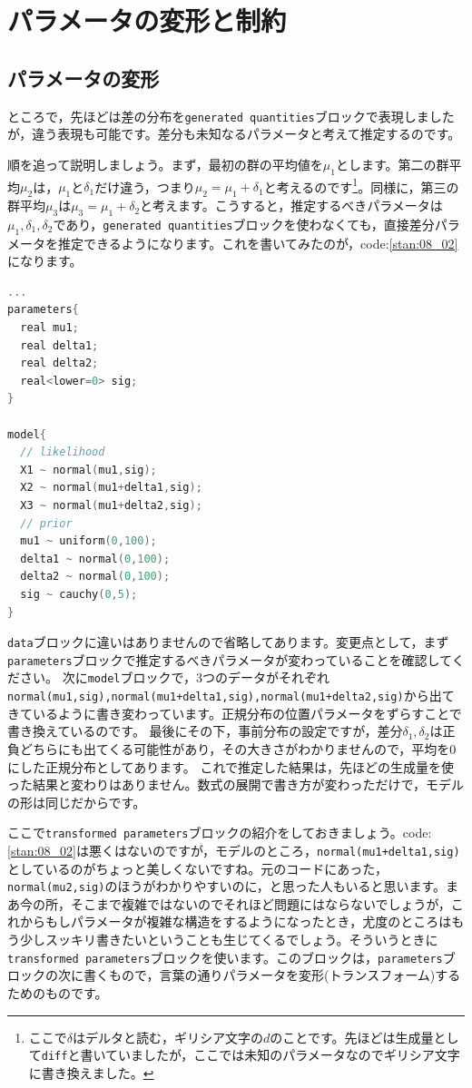 \documentclass{ltjsbook}
\begin{document}
\section{パラメータの変形と制約}
\subsection{パラメータの変形}
ところで，先ほどは差の分布を\verb|generated quantities|ブロックで表現しましたが，違う表現も可能です。差分も未知なるパラメータと考えて推定するのです。

順を追って説明しましょう。まず，最初の群の平均値を$\mu_1$とします。第二の群平均$\mu_2$は，$\mu_1$と$\delta_1$だけ違う，つまり$\mu_2=\mu_1+\delta_1$と考えるのです\footnote{ここで$\delta$はデルタと読む，ギリシア文字の$d$のことです。先ほどは生成量として\verb|diff|と書いていましたが，ここでは未知のパラメータなのでギリシア文字に書き換えました。}。同様に，第三の群平均$\mu_3$は$\mu_3 = \mu_1+\delta_2$と考えます。こうすると，推定するべきパラメータは$\mu_1,\delta_1,\delta_2$であり，\verb|generated quantities|ブロックを使わなくても，直接差分パラメータを推定できるようになります。これを書いてみたのが，code:\ref{stan:08_02}になります。

\begin{lstlisting}[language=C++,label={stan:08_02},caption={差分を直接推定するコード}]
...
parameters{
  real mu1;
  real delta1;
  real delta2;
  real<lower=0> sig;
}

model{
  // likelihood
  X1 ~ normal(mu1,sig);
  X2 ~ normal(mu1+delta1,sig);
  X3 ~ normal(mu1+delta2,sig);
  // prior
  mu1 ~ uniform(0,100);
  delta1 ~ normal(0,100);
  delta2 ~ normal(0,100);
  sig ~ cauchy(0,5);
}

\end{lstlisting}

\verb|data|ブロックに違いはありませんので省略してあります。変更点として，まず\verb|parameters|ブロックで推定するべきパラメータが変わっていることを確認してください。
次に\verb|model|ブロックで，3つのデータがそれぞれ\verb|normal(mu1,sig),normal(mu1+delta1,sig),normal(mu1+delta2,sig)|から出てきているように書き変わっています。正規分布の位置パラメータをずらすことで書き換えているのです。
最後にその下，事前分布の設定ですが，差分$\delta_1,\delta_2$は正負どちらにも出てくる可能性があり，その大きさがわかりませんので，平均を0にした正規分布としてあります。
これで推定した結果は，先ほどの生成量を使った結果と変わりはありません。数式の展開で書き方が変わっただけで，モデルの形は同じだからです。

ここで\verb|transformed parameters|ブロックの紹介をしておきましょう。code:\ref{stan:08_02}は悪くはないのですが，モデルのところ，\verb|normal(mu1+delta1,sig)|としているのがちょっと美しくないですね。元のコードにあった，\verb|normal(mu2,sig)|のほうがわかりやすいのに，と思った人もいると思います。まあ今の所，そこまで複雑ではないのでそれほど問題にはならないでしょうが，これからもしパラメータが複雑な構造をするようになったとき，尤度のところはもう少しスッキリ書きたいということも生じてくるでしょう。そういうときに\verb|transformed parameters|ブロックを使います。このブロックは，\verb|parameters|ブロックの次に書くもので，言葉の通りパラメータを変形(トランスフォーム)するためのものです。
\end{document}
